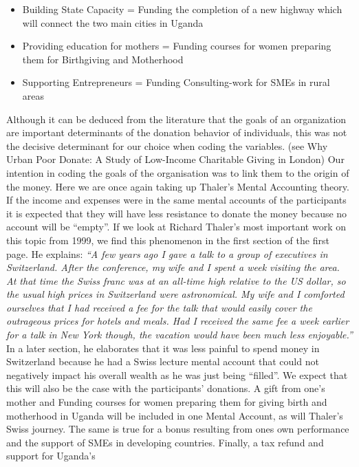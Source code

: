 \documentclass[
  12pt,
]{article}
\begin{document}
\begin{itemize}
\item
  Building State Capacity = Funding the completion of a new highway
  which will connect the two main cities in Uganda
\item
  Providing education for mothers = Funding courses for women preparing
  them for Birthgiving and Motherhood
\item
  Supporting Entrepreneurs = Funding Consulting-work for SMEs in rural
  areas
\end{itemize}

Although it can be deduced from the literature that the goals of an
organization are important determinants of the donation behavior of
individuals, this was not the decisive determinant for our choice when
coding the variables. (see Why Urban Poor Donate: A Study of Low-Income
Charitable Giving in London) Our intention in coding the goals of the
organisation was to link them to the origin of the money. Here we are
once again taking up Thaler's Mental Accounting theory. If the income
and expenses were in the same mental accounts of the participants it is
expected that they will have less resistance to donate the money because
no account will be ``empty''. If we look at Richard Thaler's most
important work on this topic from 1999, we find this phenomenon in the
first section of the first page. He explains: \emph{``A few years ago I
gave a talk to a group of executives in Switzerland. After the
conference, my wife and I spent a week visiting the area. At that time
the Swiss franc was at an all-time high relative to the US dollar, so
the usual high prices in Switzerland were astronomical. My wife and I
comforted ourselves that I had received a fee for the talk that would
easily cover the outrageous prices for hotels and meals. Had I received
the same fee a week earlier for a talk in New York though, the vacation
would have been much less enjoyable.''} In a later section, he
elaborates that it was less painful to spend money in Switzerland
because he had a Swiss lecture mental account that could not negatively
impact his overall wealth as he was just being ``filled''. We expect
that this will also be the case with the participants' donations. A gift
from one's mother and Funding courses for women preparing them for
giving birth and motherhood in Uganda will be included in one Mental
Account, as will Thaler's Swiss journey. The same is true for a bonus
resulting from ones own performance and the support of SMEs in
developing countries. Finally, a tax refund and support for Uganda's
\end{document}
